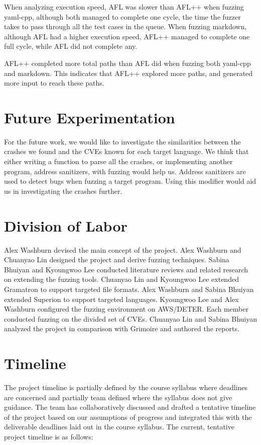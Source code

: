 \documentclass[12pt]{diazessay}
\begin{document}
When analyzing execution speed, AFL was slower than AFL++ when fuzzing yaml-cpp, although both managed to complete one cycle, the time the fuzzer takes to pass through all the test cases in the queue. When fuzzing markdown, although AFL had a higher execution speed, AFL++ managed to complete one full cycle, while AFL did not complete any.

AFL++ completed more total paths than AFL did when fuzzing both yaml-cpp and markdown. This indicates that AFL++ explored more paths, and generated more input to reach these paths.


\section*{Future Experimentation}
For the future work, we would like to investigate the similarities between the crashes we found and the CVEs known for each target language. We think that either writing a function to parse all the crashes, or implementing another program, address sanitizers, with fuzzing would help us. Address sanitizers are used to detect bugs when fuzzing a target program. Using this modifier would aid us in investigating the crashes further.


\clearpage

\section*{Division of Labor}

Alex Washburn devised the main concept of the project.
Alex Washburn and Chuanyao Lin designed the project and derive fuzzing techniques.
Sabina Bhuiyan and Kyoungwoo Lee conducted literature reviews and related research on extending the fuzzing tools.
Chuanyao Lin and Kyoungwoo Lee extended Gramatron to support targeted file formats.
Alex Washburn and Sabina Bhuiyan extended Superion to support targeted languages.
Kyoungwoo Lee and Alex Washburn configured the fuzzing environment on AWS/DETER.
Each member conducted fuzzing on the divided set of CVEs.
Chuanyao Lin and Sabina Bhuiyan analyzed the project in comparison with Grimoire and authored the reports.


\section*{Timeline}

The project timeline is partially defined by the course syllabus where deadlines are concerned
and partially team defined where the syllabus does not give guidance.
The team has collaboratively discussed and drafted a tentative timeline of the project based on our assumptions of progress and integrated this with the deliverable deadlines laid out in the course syllabus. The current, tentative project timeline is as follows:
\end{document}
